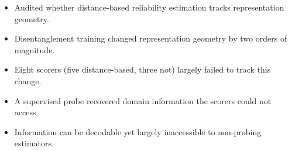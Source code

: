 \documentclass{article}
\begin{document}
\begin{itemize}
\item Audited whether distance-based reliability estimation tracks representation geometry.
\item Disentanglement training changed representation geometry by two orders of magnitude.
\item Eight scorers (five distance-based, three not) largely failed to track this change.
\item A supervised probe recovered domain information the scorers could not access.
\item Information can be decodable yet largely inaccessible to non-probing estimators.
\end{itemize}
\end{document}
